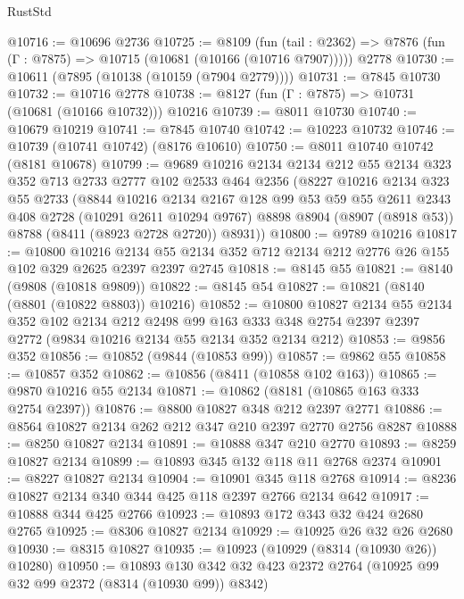 \begin{lexlean}{RustStd}
\begin{coremodule}
@10716 := @10696 @2736
@10725 := @8109
    (fun (tail : @2362) => @7876 (fun (Γ : @7875) => @10715 (@10681 (@10166 (@10716 @7907)))))
    @2778
@10730 := @10611 (@7895 (@10138 (@10159 (@7904 @2779))))
@10731 := @7845 @10730
@10732 := @10716 @2778
@10738 := @8127 (fun (Γ : @7875) => @10731 (@10681 (@10166 @10732))) @10216
@10739 := @8011 @10730
@10740 := @10679 @10219
@10741 := @7845 @10740
@10742 := @10223 @10732
@10746 := @10739 (@10741 @10742) (@8176 @10610)
@10750 := @8011 @10740 @10742 (@8181 @10678)
@10799 := @9689
    @10216
    @2134
    @2134
    @212
    @55
    @2134
    @323
    @352
    @713
    @2733
    @2777
    @102
    @2533
    @464
    @2356
    (@8227
      @10216
      @2134
      @323
      @55
      @2733
      (@8844
        @10216
        @2134
        @2167
        @128
        @99
        @53
        @59
        @55
        @2611
        @2343
        @408
        @2728
        (@10291 @2611 @10294 @9767)
        @8898
        @8904
        (@8907 (@8918 @53))
        @8788
        (@8411 (@8923 @2728 @2720))
        @8931))
@10800 := @9789 @10216
@10817 := @10800
    @10216
    @2134
    @55
    @2134
    @352
    @712
    @2134
    @212
    @2776
    @26
    @155
    @102
    @329
    @2625
    @2397
    @2397
    @2745
@10818 := @8145 @55
@10821 := @8140 (@9808 (@10818 @9809))
@10822 := @8145 @54
@10827 := @10821 (@8140 (@8801 (@10822 @8803)) @10216)
@10852 := @10800
    @10827
    @2134
    @55
    @2134
    @352
    @102
    @2134
    @212
    @2498
    @99
    @163
    @333
    @348
    @2754
    @2397
    @2397
    @2772
    (@9834 @10216 @2134 @55 @2134 @352 @2134 @212)
@10853 := @9856 @352
@10856 := @10852 (@9844 (@10853 @99))
@10857 := @9862 @55
@10858 := @10857 @352
@10862 := @10856 (@8411 (@10858 @102 @163))
@10865 := @9870 @10216 @55 @2134
@10871 := @10862 (@8181 (@10865 @163 @333 @2754 @2397))
@10876 := @8800 @10827 @348 @212 @2397 @2771
@10886 := @8564 @10827 @2134 @262 @212 @347 @210 @2397 @2770 @2756 @8287
@10888 := @8250 @10827 @2134
@10891 := @10888 @347 @210 @2770
@10893 := @8259 @10827 @2134
@10899 := @10893 @345 @132 @118 @11 @2768 @2374
@10901 := @8227 @10827 @2134
@10904 := @10901 @345 @118 @2768
@10914 := @8236 @10827 @2134 @340 @344 @425 @118 @2397 @2766 @2134 @642
@10917 := @10888 @344 @425 @2766
@10923 := @10893 @172 @343 @32 @424 @2680 @2765
@10925 := @8306 @10827 @2134
@10929 := @10925 @26 @32 @26 @2680
@10930 := @8315 @10827
@10935 := @10923 (@10929 (@8314 (@10930 @26)) @10280)
@10950 := @10893
    @130
    @342
    @32
    @423
    @2372
    @2764
    (@10925 @99 @32 @99 @2372 (@8314 (@10930 @99)) @8342)

\end{coremodule}
\end{lexlean}

